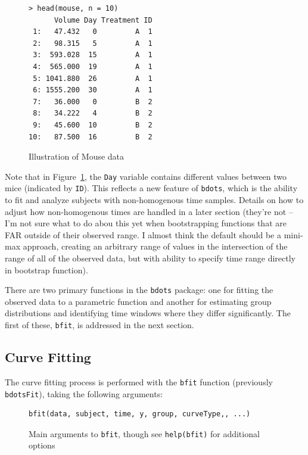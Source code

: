 \documentclass{article}
\newcommand{\xt}{\texttt}%
\begin{document}
\begin{singlespace}
\begin{figure}
\centering
\begin{BVerbatim}
> head(mouse, n = 10)
      Volume Day Treatment ID
 1:   47.432   0         A  1
 2:   98.315   5         A  1
 3:  593.028  15         A  1
 4:  565.000  19         A  1
 5: 1041.880  26         A  1
 6: 1555.200  30         A  1
 7:   36.000   0         B  2
 8:   34.222   4         B  2
 9:   45.600  10         B  2
10:   87.500  16         B  2
\end{BVerbatim}
\caption{Illustration of Mouse data}
\label{fig:mouse_head}
\end{figure}
\end{singlespace}

Note that in Figure~\ref{fig:mouse_head}, the \xt{Day} variable contains different values between two mice (indicated by \xt{ID}). This reflects a new feature of \xt{bdots}, which is the ability to fit and analyze subjects with non-homogenous time samples. Details on how to adjust how non-homogenous times are handled in a later section (they're not -- I'm not sure what to do abou this yet when bootstrapping functions that are FAR outside of their observed range. I almost think the default should be a mini-max approach, creating an arbitrary range of values in the intersection of the range of all of the observed data, but with ability to specify time range directly in bootstrap function).

There are two primary functions in the \xt{bdots} package: one for fitting the observed data to a parametric function and another for estimating group distributions and identifying time windows where they differ significantly. The first of these, \xt{bfit}, is addressed in the next section.


\subsection{Curve Fitting}

The curve fitting process is performed with the \texttt{bfit} function (previously \texttt{bdotsFit}), taking the following arguments:


\begin{figure}[h!]
\centering
\begin{BVerbatim}
bfit(data, subject, time, y, group, curveType,, ...)
\end{BVerbatim}
\caption{Main arguments to \xt{bfit}, though see \xt{help(bfit)} for additional options}
\end{figure}
\end{document}
